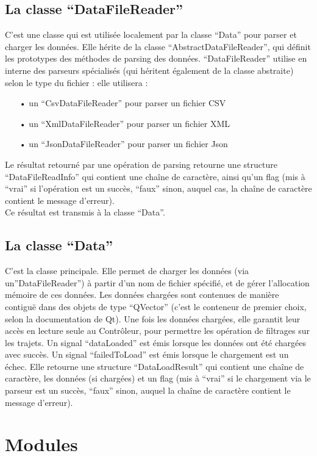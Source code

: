 \documentclass[12pt]{article}
\begin{document}
		\subsection{La classe “DataFileReader”}
		C’est une classe qui est utilisée localement par la classe “Data” pour parser et
		charger les données. Elle hérite de la classe “AbstractDataFileReader”, qui définit
		les prototypes des méthodes de parsing des données. “DataFileReader” utilise en
		interne des parseurs spécialisés (qui héritent également de la classe abstraite) selon
		le type du fichier : elle utilisera :
		\begin{itemize}
			\item[•]un “CsvDataFileReader” pour parser un fichier CSV
			\item[•]un “XmlDataFileReader” pour parser un fichier XML
			\item[•]un “JsonDataFileReader” pour parser un fichier Json
		\end{itemize}

		Le résultat retourné par une opération de parsing retourne une structure
		“DataFileReadInfo” qui contient une chaîne de caractère, ainsi qu’un flag
		(mis à “vrai” si l’opération est un succès, “faux” sinon, auquel cas, la chaîne
		de caractère contient le message d’erreur).\\
		Ce résultat est transmis à la classe “Data”.
		
		\subsection{La classe “Data”}
		C’est la classe principale. Elle permet de charger les données (via un”DataFileReader”)
		à partir d’un nom de fichier spécifié, et de gérer l’allocation mémoire de ces données.
		Les données chargées sont contenues de manière contiguë dans des objets de type “QVector”
		(c’est le conteneur de premier choix, selon la documentation de Qt).
		Une fois les données chargées, elle garantit leur accès en lecture seule au Contrôleur,
		pour permettre les opération de filtrages sur les trajets. Un signal “dataLoaded” est
		émis lorsque les données ont été chargées avec succès. Un signal “failedToLoad” est
		émis lorsque le chargement est un échec. Elle retourne une structure “DataLoadResult”
		qui contient une chaîne de caractère, les données (si chargées) et un flag (mis à “vrai”
		si le chargement via le parseur est un succès, “faux” sinon, auquel la chaîne de
		caractère contient le message d’erreur).

	\section{Modules}
\end{document}

